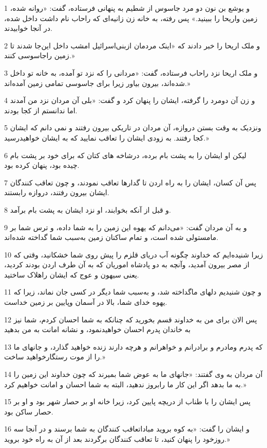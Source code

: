 \par 1 و یوشع بن نون دو مرد جاسوس از شطیم به پنهانی فرستاده، گفت: «روانه شده، زمین واریحا را ببینید.» پس رفته، به خانه زن زانیه‌ای که راحاب نام داشت داخل شده، در آنجا خوابیدند.
\par 2 و ملک اریحا را خبر دادند که «اینک مردمان ازبنی‌اسرائیل امشب داخل این‌جا شدند تا زمین راجاسوسی کنند.»
\par 3 و ملک اریحا نزد راحاب فرستاده، گفت: «مردانی را که نزد تو آمده، به خانه تو داخل شده‌اند، بیرون بیاور زیرا برای جاسوسی تمامی زمین آمده‌اند.»
\par 4 و زن آن دومرد را گرفته، ایشان را پنهان کرد و گفت: «بلی آن مردان نزد من آمدند اما ندانستم از کجا بودند.
\par 5 ونزدیک به وقت بستن دروازه، آن مردان در تاریکی بیرون رفتند و نمی دانم که ایشان کجا رفتند. به زودی ایشان را تعاقب نمایید که به ایشان خواهیدرسید.»
\par 6 لیکن او ایشان را به پشت بام برده، درشاخه های کتان که برای خود بر پشت بام چیده بود، پنهان کرده بود.
\par 7 پس آن کسان، ایشان را به راه اردن تا گدارها تعاقب نمودند، و چون تعاقب کنندگان ایشان بیرون رفتند، دروازه رابستند.
\par 8 و قبل از آنکه بخوابند، او نزد ایشان به پشت بام برآمد.
\par 9 و به آن مردان گفت: «می‌دانم که یهوه این زمین را به شما داده، و ترس شما بر مامستولی شده است، و تمام ساکنان زمین به‌سبب شما گداخته شده‌اند.
\par 10 زیرا شنیده‌ایم که خداوند چگونه آب دریای قلزم را پیش روی شما خشکانید، وقتی که از مصر بیرون آمدید، وآنچه به دو پادشاه اموریان که به آن طرف اردن بودند کردید، یعنی سیهون و عوج که ایشان راهلاک ساختید.
\par 11 و چون شنیدیم دلهای ماگداخته شد، و به‌سبب شما دیگر در کسی جان نماند، زیرا که یهوه خدای شما، بالا در آسمان وپایین بر زمین خداست.
\par 12 پس الان برای من به خداوند قسم بخورید که چنانکه به شما احسان کردم، شما نیز به خاندان پدرم احسان خواهیدنمود، و نشانه امانت به من بدهید
\par 13 که پدرم ومادرم و برادرانم و خواهرانم و هر‌چه دارند زنده خواهید گذارد، و جانهای ما را از موت رستگارخواهید ساخت.»
\par 14 آن مردان به وی گفتند: «جانهای ما به عوض شما بمیرند که چون خداوند این زمین را به ما بدهد اگر این کار ما رابروز ندهید، البته به شما احسان و امانت خواهیم کرد.»
\par 15 پس ایشان را با طناب از دریچه پایین کرد، زیرا خانه او بر حصار شهر بود و او بر حصار ساکن بود.
\par 16 و ایشان را گفت: «به کوه بروید مباداتعاقب کنندگان به شما برسند و در آنجا سه روزخود را پنهان کنید، تا تعاقب کنندگان برگردند بعد از آن به راه خود بروید.»
